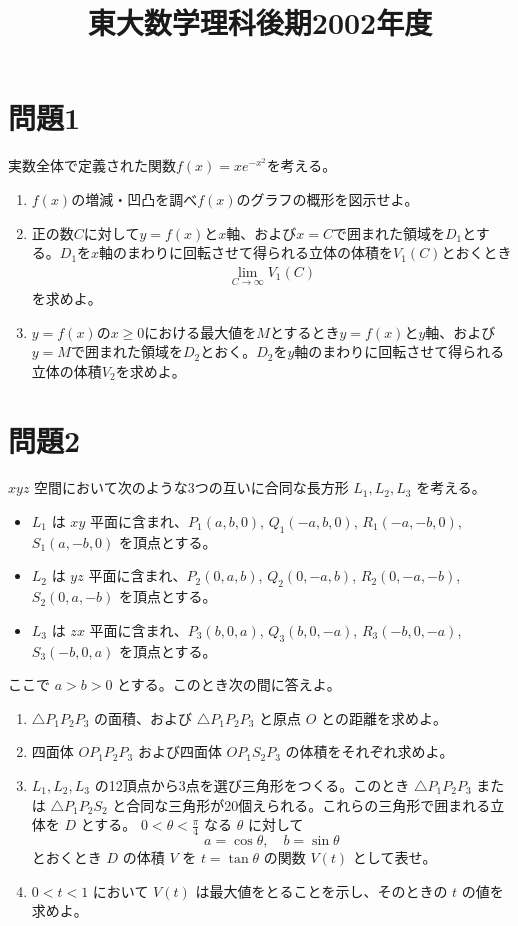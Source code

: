 \documentclass[unicode,12pt, A4j]{ltjsarticle}%
\title{東大数学理科後期2002年度}
\author{}
\date{}
\begin{document}
\maketitle

\section{問題1}
実数全体で定義された関数$f(x) = xe^{-x^2}$を考える。

\begin{enumerate}
  \item $f(x)$の増減・凹凸を調べ$f(x)$のグラフの概形を図示せよ。
  \item 正の数$C$に対して$y=f(x)$と$x$軸、および$x = C$で囲まれた領域を$D_1$とする。$D_1$を$x$軸のまわりに回転させて得られる立体の体積を$V_1(C)$とおくとき
  \begin{align}
  \lim_{C \to \infty} V_1(C)
  \end{align}  
  を求めよ。
  \item $y = f(x)$の$x \geq 0$における最大値を$M$とするとき$y = f(x)$と$y$軸、および$y = M$で囲まれた領域を$D_2$とおく。$D_2$を$y$軸のまわりに回転させて得られる立体の体積$V_2$を求めよ。
\end{enumerate}


\section{問題2}
$xyz$ 空間において次のような3つの互いに合同な長方形 $L_1, L_2, L_3$ を考える。
\begin{itemize}
    \item $L_1$ は $xy$ 平面に含まれ、$P_1(a, b, 0)$, $Q_1(-a, b, 0)$, $R_1(-a, -b, 0)$, $S_1(a, -b, 0)$ を頂点とする。
    \item $L_2$ は $yz$ 平面に含まれ、$P_2(0, a, b)$, $Q_2(0, -a, b)$, $R_2(0, -a, -b)$, $S_2(0, a, -b)$ を頂点とする。
    \item $L_3$ は $zx$ 平面に含まれ、$P_3(b, 0, a)$, $Q_3(b, 0, -a)$, $R_3(-b, 0, -a)$, $S_3(-b, 0, a)$ を頂点とする。
\end{itemize}
ここで $a > b > 0$ とする。このとき次の間に答えよ。

\begin{enumerate}
    \item $\triangle P_1 P_2 P_3$ の面積、および $\triangle P_1 P_2 P_3$ と原点 $O$ との距離を求めよ。
    \item 四面体 $O P_1 P_2 P_3$ および四面体 $O P_1 S_2 P_3$ の体積をそれぞれ求めよ。
    \item $L_1, L_2, L_3$ の12頂点から3点を選び三角形をつくる。このとき $\triangle P_1 P_2 P_3$ または $\triangle P_1 P_2 S_2$ と合同な三角形が20個えられる。これらの三角形で囲まれる立体を $D$ とする。 $0 < \theta < \frac{\pi}{4}$ なる $\theta$ に対して
    \[
    a = \cos \theta, \quad b = \sin \theta
    \]
    とおくとき $D$ の体積 $V$ を $t = \tan \theta$ の関数 $V(t)$ として表せ。
    \item $0 < t < 1$ において $V(t)$ は最大値をとることを示し、そのときの $t$ の値を求めよ。
\end{enumerate}
\end{document}
